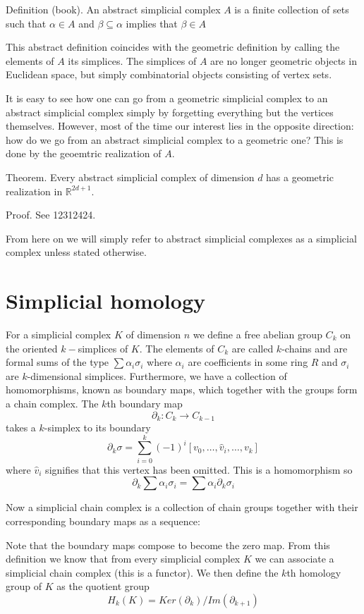 Definition (book). An abstract simplicial complex $A$ is a finite collection of sets such that $\alpha \in A$ and $\beta \subseteq \alpha$ implies that $\beta \in A$

This abstract definition coincides with the geometric definition by calling the elements of $A$ its simplices. The simplices of $A$ are no longer geometric objects in Euclidean space, but simply combinatorial objects consisting of vertex sets.

It is easy to see how one can go from a geometric simplicial complex to an abstract simplicial complex simply by forgetting everything but the vertices themselves. However, most of the time our interest lies in the opposite direction: how do we go from an abstract simplicial complex to a geometric one? This is done by the geoemtric realization of $A$.

Theorem. Every abstract simplicial complex of dimension $d$ has a geometric realization in $\mathbb{R}^{2d+1}$.

Proof. See 12312424.

From here on we will simply refer to abstract simplicial complexes as a simplicial complex unless stated otherwise.
\section{Simplicial homology}
For a simplicial complex $K$ of dimension $n$ we define a free abelian group $C_{k}$ on the oriented $k-$simplices of $K$.
The elements of $C_{k}$ are called $k$-chains and are formal sums of the type
$\sum \alpha_{i} \sigma_{i}$
where $\alpha_{i}$ are coefficients in some ring $R$ and $\sigma_{i}$ are $k$-dimensional simplices. Furthermore, we have a collection of homomorphisms, known as boundary maps, which together with the groups form a chain complex. The $k$th boundary map
\[ \partial_{k}: C_{k} \to C_{k-1}\]
takes a $k$-simplex to its boundary
\[ \partial_{k} \sigma = \sum^{k}_{{i=0}} (-1)^{i} [v_{0},\dots,\hat v_{i}, \dots, v_{k}]\]
where $\hat v_{i}$ signifies that this vertex has been omitted. This is a homomorphism so
\[\partial_{k} \sum \alpha_{i}\sigma_{i} = \sum \alpha_{i} \partial_{k} \sigma_{i}\]

Now a simplicial chain complex is a collection of chain groups together with their corresponding boundary maps as a sequence:
\begin{center}
\end{center}
Note that the boundary maps compose to become the zero map. From this definition we know that from every simplicial complex $K$ we can associate a simplicial chain complex (this is a functor). We then define the $k$th homology group of $K$ as the quotient group
\[H_{k}(K) = Ker(\partial_{k})/Im(\partial_{k+1})\]

